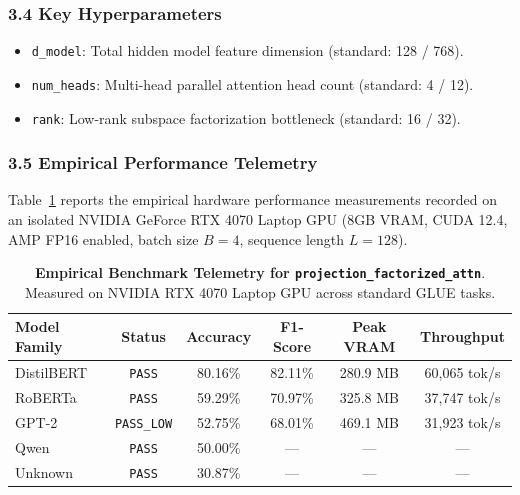 \subsubsection*{3.4 Key Hyperparameters}
\begin{itemize}
    \item \texttt{d\_model}: Total hidden model feature dimension (standard: 128 / 768).
    \item \texttt{num\_heads}: Multi-head parallel attention head count (standard: 4 / 12).
    \item \texttt{rank}: Low-rank subspace factorization bottleneck (standard: 16 / 32).
\end{itemize}

\subsubsection*{3.5 Empirical Performance Telemetry}
Table~\ref{tab:telemetry_projection_factorized_attn} reports the empirical hardware performance measurements recorded on an isolated NVIDIA GeForce RTX 4070 Laptop GPU (8GB VRAM, CUDA 12.4, AMP FP16 enabled, batch size $B=4$, sequence length $L=128$).

\begin{table}[h]
\centering
\small
\caption{\textbf{Empirical Benchmark Telemetry for \texttt{projection\_factorized\_attn}}. Measured on NVIDIA RTX 4070 Laptop GPU across standard GLUE tasks.}
\label{tab:telemetry_projection_factorized_attn}
\begin{tabular*}{\columnwidth}{@{\extracolsep{\fill}}lccccc}
\toprule
\textbf{Model Family} & \textbf{Status} & \textbf{Accuracy} & \textbf{F1-Score} & \textbf{Peak VRAM} & \textbf{Throughput} \\
\midrule
DistilBERT & \texttt{PASS} & 80.16\% & 82.11\% & 280.9 MB & 60,065 tok/s \\
RoBERTa & \texttt{PASS} & 59.29\% & 70.97\% & 325.8 MB & 37,747 tok/s \\
GPT-2 & \texttt{PASS\_LOW} & 52.75\% & 68.01\% & 469.1 MB & 31,923 tok/s \\
Qwen & \texttt{PASS} & 50.00\% & --- & --- & --- \\
Unknown & \texttt{PASS} & 30.87\% & --- & --- & --- \\
\bottomrule
\end{tabular*}
\end{table}

